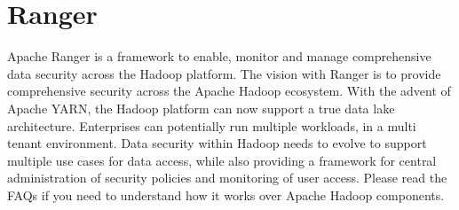 \section{Ranger}

Apache Ranger\cite{hid-sp18-515-www-ranger} is a framework to enable, 
monitor and manage comprehensive data security across the Hadoop 
platform.
The vision with Ranger is to provide comprehensive security across 
the Apache Hadoop ecosystem. With the advent of Apache YARN, the 
Hadoop platform can now support a true data lake architecture. 
Enterprises can potentially run multiple workloads, in a multi 
tenant environment. Data security within Hadoop needs to evolve 
to support multiple use cases for data access, while also providing 
a framework for central administration of security policies and 
monitoring of user access.
Please read the FAQs if you need to understand how it works over 
Apache Hadoop components.
